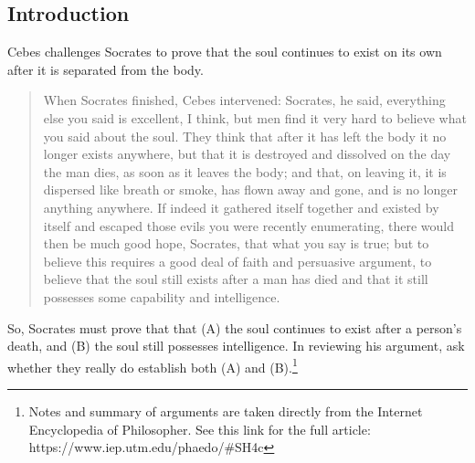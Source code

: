 \documentclass[oneside]{article}
\begin{document}
\thispagestyle{fancy}
\subsection*{Introduction}
Cebes challenges Socrates to prove that the soul continues to exist on its own after it is separated from the body.
\begin{quote}
When Socrates finished, Cebes intervened: Socrates, he said, everything else you said is excellent, I think, but men find it very hard to believe what you said about the soul. They think that after it has left the body it no longer exists anywhere, but that it is destroyed and dissolved on the day the man dies, as soon as it leaves the body; and that, on leaving it, it is dispersed like breath or smoke, has flown away and gone, and is no longer anything anywhere. If indeed it gathered itself together and existed by itself and escaped those evils you were recently enumerating, there would then be much good hope, Socrates, that what you say is true; but to believe this requires a good deal of faith and persuasive argument, to believe that the soul still exists after a man has died and that it still possesses some capability and intelligence.
\end{quote}
So, Socrates must prove that that (A) the soul continues to exist after a person's death, and (B) the soul still possesses intelligence. In reviewing his argument, ask whether they really do establish both (A) and (B).\footnote{Notes and summary of arguments are taken directly from the Internet Encyclopedia of Philosopher. See this link for the full article:  https://www.iep.utm.edu/phaedo/#SH4c} 
\end{document}
